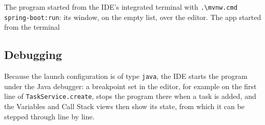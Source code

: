   {The program started from the IDE's integrated terminal with \texttt{.\textbackslash{}mvnw.cmd spring-boot:run}: its window, on
   the empty list, over the editor.}
  {The app started from the terminal}

\subsection{Debugging}

Because the launch configuration is of type \texttt{java}, the IDE starts the program under the Java debugger: a
breakpoint set in the editor, for example on the first line of \texttt{TaskService.create}, stops the program there
when a task is added, and the Variables and Call Stack views then show its state, from which it can be stepped
through line by line.
